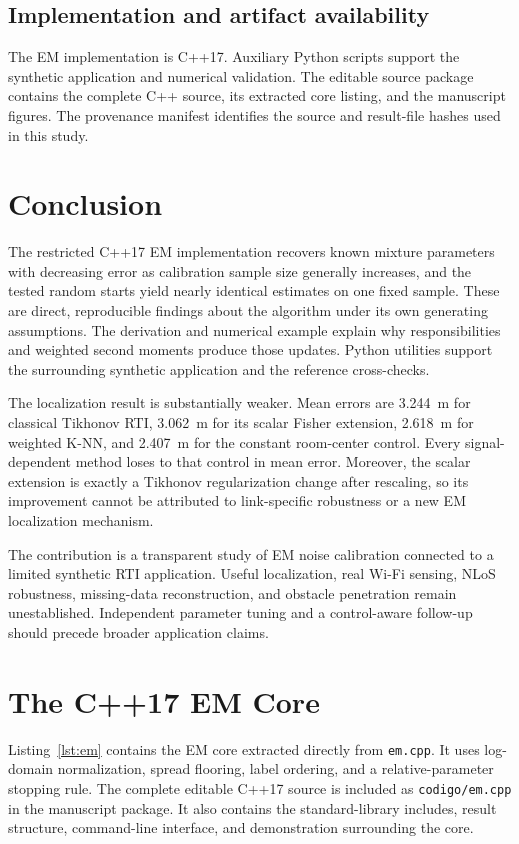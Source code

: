 \documentclass[conference,letterpaper]{IEEEtran}
\begin{document}
\subsection{Implementation and artifact availability}
The EM implementation is C++17. Auxiliary Python scripts support the synthetic application and numerical validation. The editable source package contains the complete C++ source, its extracted core listing, and the manuscript figures. The provenance manifest identifies the source and result-file hashes used in this study.

\section{Conclusion}
The restricted C++17 EM implementation recovers known mixture parameters with decreasing error as calibration sample size generally increases, and the tested random starts yield nearly identical estimates on one fixed sample. These are direct, reproducible findings about the algorithm under its own generating assumptions. The derivation and numerical example explain why responsibilities and weighted second moments produce those updates. Python utilities support the surrounding synthetic application and the reference cross-checks.

The localization result is substantially weaker. Mean errors are 3.244~m for classical Tikhonov RTI, 3.062~m for its scalar Fisher extension, 2.618~m for weighted K-NN, and 2.407~m for the constant room-center control. Every signal-dependent method loses to that control in mean error. Moreover, the scalar extension is exactly a Tikhonov regularization change after rescaling, so its improvement cannot be attributed to link-specific robustness or a new EM localization mechanism.

The contribution is a transparent study of EM noise calibration connected to a limited synthetic RTI application. Useful localization, real Wi-Fi sensing, NLoS robustness, missing-data reconstruction, and obstacle penetration remain unestablished. Independent parameter tuning and a control-aware follow-up should precede broader application claims.

\appendices
\section{The C++17 EM Core}
\label{app:code}
Listing~\ref{lst:em} contains the EM core extracted directly from \texttt{em.cpp}. It uses log-domain normalization, spread flooring, label ordering, and a relative-parameter stopping rule. The complete editable C++17 source is included as \texttt{codigo/em.cpp} in the manuscript package. It also contains the standard-library includes, result structure, command-line interface, and demonstration surrounding the core.
\end{document}
